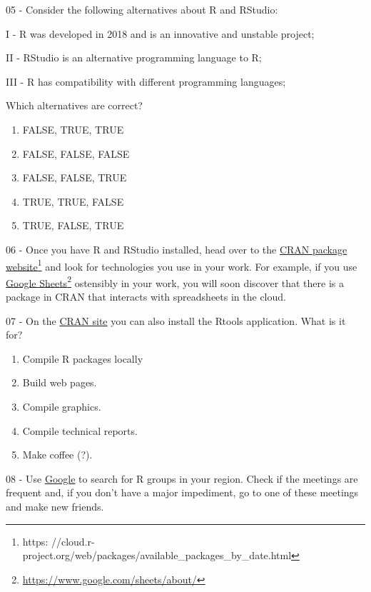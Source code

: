 \documentclass[
  12pt,
]{book}
\providecommand{\tightlist}{%
  \setlength{\itemsep}{0pt}\setlength{\parskip}{0pt}}
\begin{document}
05 -
Consider the following alternatives about R and RStudio:

I - R was developed in 2018 and is an innovative and unstable project;

II - RStudio is an alternative programming language to R;

III - R has compatibility with different programming languages;

Which alternatives are correct?

\begin{enumerate}
\def\labelenumi{\alph{enumi})}
\tightlist
\item
  FALSE, TRUE, TRUE
\item
  FALSE, FALSE, FALSE
\item
  FALSE, FALSE, TRUE
\item
  TRUE, TRUE, FALSE
\item
  TRUE, FALSE, TRUE
\end{enumerate}

06 -
Once you have R and RStudio installed, head over to the \href{https://cloud.r-project.org/web/packages/available_packages_by_date.html}{CRAN package website}\footnote{https: //cloud.r- project.org/web/packages/available\_packages\_by\_date.html} and look for technologies you use in your work. For example, if you use \href{https://www.google.com/sheets/about/}{Google Sheets}\footnote{\url{https://www.google.com/sheets/about/}} ostensibly in your work, you will soon discover that there is a package in CRAN that interacts with spreadsheets in the cloud.

07 -
On the \href{https://cloud.r-project.org/bin/windows/}{CRAN site} you can also install the Rtools application. What is it for?

\begin{enumerate}
\def\labelenumi{\alph{enumi})}
\tightlist
\item
  Compile R packages locally
\item
  Build web pages.
\item
  Compile graphics.
\item
  Compile technical reports.
\item
  Make coffee (?).
\end{enumerate}

08 -
Use \href{https://www.google.com/search?q=R+groups+in+my+city}{Google} to search for R groups in your region. Check if the meetings are frequent and, if you don't have a major impediment, go to one of these meetings and make new friends.
\end{document}
